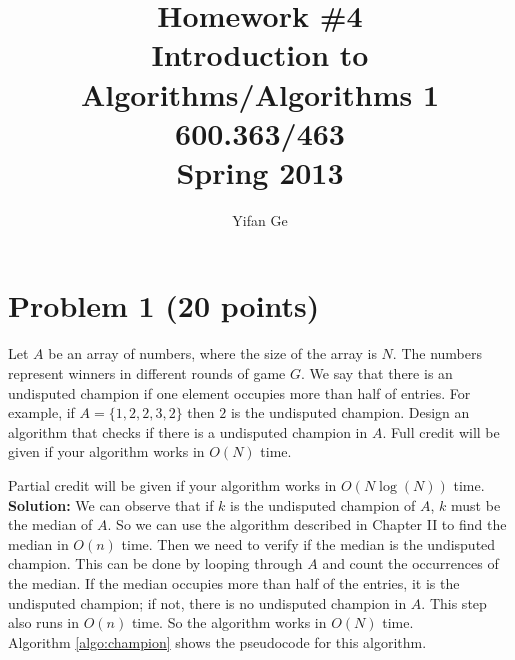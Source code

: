 \documentclass[letterpaper, 11pt]{article}
\begin{document}
\title{Homework \#4 \\ Introduction to Algorithms/Algorithms 1 \\ 600.363/463 \\Spring 2013}
\author{Yifan Ge}

\maketitle

\section{Problem 1 (20 points)} %
Let $A$ be an array of numbers, where the size of the array is $N$.
The numbers represent winners in different rounds of game $G$.
We say that there is an undisputed champion if one element occupies more than half of entries.
For example, if $A = \{1,2,2,3, 2\}$ then $2$ is the undisputed champion.
Design an algorithm that checks if there is a undisputed champion in $A$.
Full credit will be given if your algorithm works in $O(N)$ time.

Partial credit will be given if your algorithm works in $O(N\log(N))$ time.\\

\textbf{Solution:} We can observe that if $k$ is the undisputed champion of $A$, $k$ must be the median of $A$. So we can use the algorithm described in Chapter II to find the median in $O(n)$ time. Then we need to verify if the median is the undisputed champion. This can be done by looping through $A$ and count the occurrences of the median. If the median occupies more than half of the entries, it is the undisputed champion; if not, there is no undisputed champion in $A$. This step also runs in $O(n)$ time. So the algorithm works in $O(N)$ time.\\
Algorithm \ref{algo:champion} shows the pseudocode for this algorithm.\\
\end{document}
